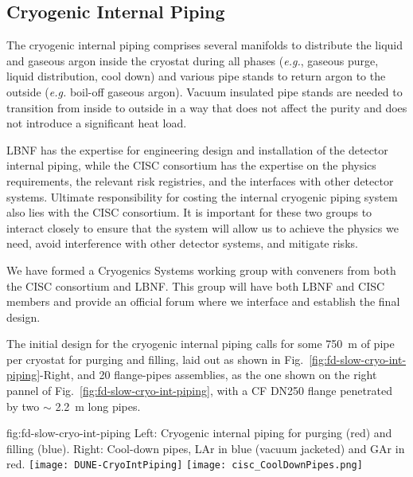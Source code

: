 \subsection{Cryogenic Internal Piping}
\label{sec:fdgen-slow-cryo-int-piping}
\label{sec:fdsp-slow-cryo-int-piping}
\label{sec:fddp-slow-cryo-int-piping}


The cryogenic internal piping comprises several manifolds to
distribute the liquid and gaseous argon inside the cryostat during all
phases ({\em e.g.}, gaseous purge, liquid distribution, cool down) and
various pipe stands to return argon to the outside ({\em e.g.}
boil-off gaseous argon).  Vacuum insulated pipe stands are needed to
transition from inside to outside in a way that does not affect the
purity and does not introduce a significant heat load.

LBNF has the expertise for engineering design and installation of the
detector internal piping, while the CISC consortium has the expertise
on the physics requirements, the relevant risk registries, and the
interfaces with other detector systems. Ultimate responsibility for
costing the internal cryogenic piping system also lies with the CISC
consortium. It is important for these two groups to interact closely
to ensure that the system will allow us to achieve the physics we
need, avoid interference with other detector systems, and mitigate
risks.

We have formed a Cryogenics Systems working group with conveners from
both the CISC consortium and LBNF. This group will have both LBNF and
CISC members and provide an official forum where we interface and
establish the final design.

The initial design for the cryogenic internal piping calls for some
\SI{750}{m} of pipe per cryostat for purging and filling, laid out as
shown in Fig.~\ref{fig:fd-slow-cryo-int-piping}-Right, and 20 flange-pipes assemblies, as the one shown
on the right pannel of Fig.~\ref{fig:fd-slow-cryo-int-piping}, with a CF DN250 flange penetrated by two $\sim$ \SI{2.2}{m} long pipes.

\begin{dunefigure}{fig:fd-slow-cryo-int-piping}
  {Left: Cryogenic internal piping for purging (red) and filling (blue). Right: Cool-down pipes, LAr in blue (vacuum jacketed) and GAr in red. }
  \texttt{[image: DUNE-CryoIntPiping]}
  \texttt{[image: cisc\_CoolDownPipes.png]}
\end{dunefigure}



